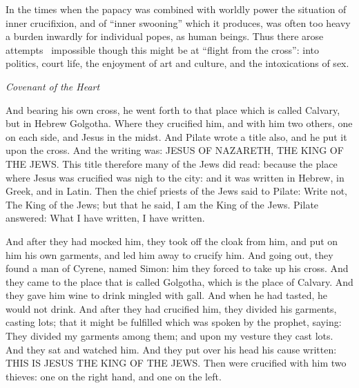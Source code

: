 \begin{quotationx}
In the times when the papacy was combined with worldly power the situation of inner crucifixion, and of “inner swooning”
which it produces, was often too heavy a burden inwardly for individual popes, as human beings. Thus there arose
attempts  impossible though this might be at “flight from the cross”: into politics, court life, the enjoyment of art
and culture, and the intoxications of sex. \begin{flushright} \textit{Covenant of the Heart}\end{flushright}

\end{quotationx}

And bearing his own cross, he went forth to that place which is called Calvary, but in Hebrew Golgotha. Where they
crucified him, and with him two others, one on each side, and Jesus in the midst. And Pilate wrote a title also, and he
put it upon the cross. And the writing was: JESUS OF NAZARETH, THE KING OF THE JEWS. This title therefore many of the
Jews did read: because the place where Jesus was crucified was nigh to the city: and it was written in Hebrew, in
Greek, and in Latin. Then the chief priests of the Jews said to Pilate: Write not, The King of the Jews; but that he
said, I am the King of the Jews. Pilate answered: What I have written, I have written.

And after they had mocked him, they took off the cloak from him, and put on him his own garments, and led him away to
crucify him. And going out, they found a man of Cyrene, named Simon: him they forced to take up his cross. And they
came to the place that is called Golgotha, which is the place of Calvary. And they gave him wine to drink mingled with
gall. And when he had tasted, he would not drink. And after they had crucified him, they divided his garments, casting
lots; that it might be fulfilled which was spoken by the prophet, saying: They divided my garments among them; and upon
my vesture they cast lots. And they sat and watched him. And they put over his head his cause written: THIS IS JESUS
THE KING OF THE JEWS. Then were crucified with him two thieves: one on the right hand, and one on the left.

